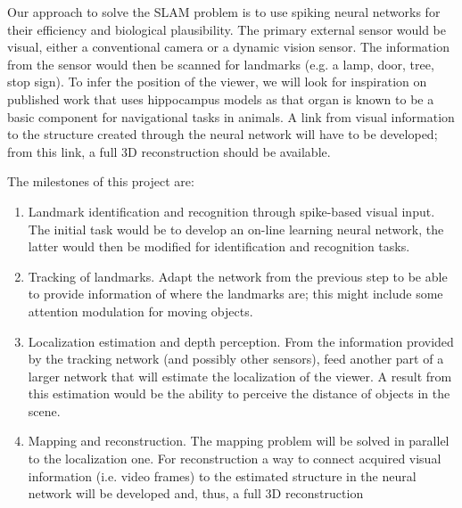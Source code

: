 Our approach to solve the SLAM problem is to use spiking neural networks for their efficiency and biological plausibility. The primary external sensor would be visual, either a conventional camera or a dynamic vision sensor. The information from the sensor would then be scanned for landmarks (e.g. a lamp, door, tree, stop sign). To infer the position of the viewer, we will look for inspiration on published work that uses hippocampus models as that organ is known to be a basic component for navigational tasks in animals. A link from visual information to the structure created through the neural network will have to be developed; from this link, a full 3D reconstruction should be available.

The milestones of this project are:
\begin{enumerate}
  \item Landmark identification and recognition through spike-based visual input. The initial task would be to develop an on-line learning neural network, the latter would then be modified for identification and recognition tasks.
  \item Tracking of landmarks. Adapt the network from the previous step to be able to provide information of where the landmarks are; this might include some attention modulation for moving objects.
  \item Localization estimation and depth perception. From the information provided by the tracking network (and possibly other sensors), feed another part of a larger network that will estimate the localization of the viewer. A result from this estimation would be the ability to perceive the distance of objects in the scene. 
  \item Mapping and reconstruction. The mapping problem will be solved in parallel to the localization one. For reconstruction a way to connect acquired visual information (i.e. video frames) to the estimated structure in the neural network will be developed and, thus, a full 3D reconstruction 
\end{enumerate}